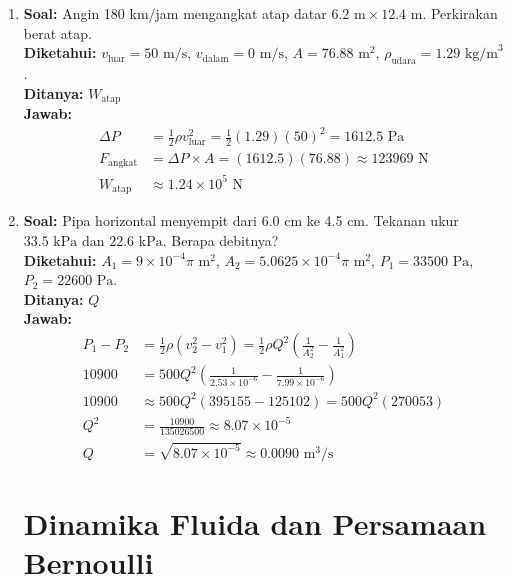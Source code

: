 \documentclass[twocolumn]{article}
\begin{document}
\begin{enumerate}
    \item \textbf{Soal:} Angin 180 km/jam mengangkat atap datar $6.2 \text{ m} \times 12.4 \text{ m}$. Perkirakan berat atap. \\
    \textbf{Diketahui:} $v_{\text{luar}} = 50 \text{ m/s}$, $v_{\text{dalam}} = 0 \text{ m/s}$, $A = 76.88 \text{ m}^2$, $\rho_{\text{udara}} = 1.29 \text{ kg/m}^3$. \\
    \textbf{Ditanya:} $W_{\text{atap}}$ \\
    \textbf{Jawab:}
    \begin{align*}
        \Delta P &= \frac{1}{2}\rho v_{\text{luar}}^2 = \frac{1}{2}(1.29)(50)^2 = 1612.5 \text{ Pa} \\
        F_{\text{angkat}} &= \Delta P \times A = (1612.5)(76.88) \approx 123969 \text{ N} \\
        W_{\text{atap}} &\approx 1.24 \times 10^5 \text{ N}
    \end{align*}

    \item \textbf{Soal:} Pipa horizontal menyempit dari 6.0 cm ke 4.5 cm. Tekanan ukur $33.5 \text{ kPa}$ dan $22.6 \text{ kPa}$. Berapa debitnya? \\
    \textbf{Diketahui:} $A_1 = 9 \times 10^{-4} \pi \text{ m}^2$, $A_2 = 5.0625 \times 10^{-4} \pi \text{ m}^2$, $P_1 = 33500 \text{ Pa}$, $P_2 = 22600 \text{ Pa}$. \\
    \textbf{Ditanya:} $Q$ \\
    \textbf{Jawab:}
    \begin{align*}
        P_1 - P_2 &= \frac{1}{2}\rho \left( v_2^2 - v_1^2 \right) = \frac{1}{2}\rho Q^2 \left( \frac{1}{A_2^2} - \frac{1}{A_1^2} \right) \\
        10900 &= 500 Q^2 \left( \frac{1}{2.53 \times 10^{-6}} - \frac{1}{7.99 \times 10^{-6}} \right) \\
        10900 &\approx 500 Q^2 (395155 - 125102) = 500 Q^2 (270053) \\
        Q^2 &= \frac{10900}{135026500} \approx 8.07 \times 10^{-5} \\
        Q &= \sqrt{8.07 \times 10^{-5}} \approx 0.0090 \text{ m}^3/\text{s}
    \end{align*}

    \section*{Dinamika Fluida dan Persamaan Bernoulli}


\end{enumerate}
\end{document}
